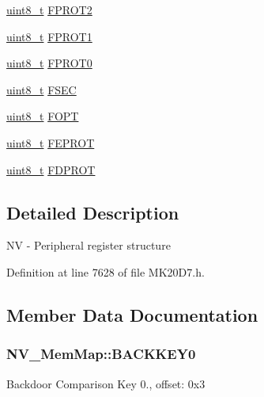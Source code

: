 \begin{DoxyCompactItemize}
\item 
\hyperlink{_p_e___types_8h_aba7bc1797add20fe3efdf37ced1182c5}{uint8\+\_\+t} \hyperlink{struct_n_v___mem_map_aace11e44cee29095fe7c0bf683039f57}{F\+P\+R\+O\+T2}
\item 
\hyperlink{_p_e___types_8h_aba7bc1797add20fe3efdf37ced1182c5}{uint8\+\_\+t} \hyperlink{struct_n_v___mem_map_a87204afdff32b371c03caafdf5a07b69}{F\+P\+R\+O\+T1}
\item 
\hyperlink{_p_e___types_8h_aba7bc1797add20fe3efdf37ced1182c5}{uint8\+\_\+t} \hyperlink{struct_n_v___mem_map_a93d4a444c27eba9b9d8939e52440e8e8}{F\+P\+R\+O\+T0}
\item 
\hyperlink{_p_e___types_8h_aba7bc1797add20fe3efdf37ced1182c5}{uint8\+\_\+t} \hyperlink{struct_n_v___mem_map_acb89fbc884fb10887ef063d1aa892b29}{F\+S\+EC}
\item 
\hyperlink{_p_e___types_8h_aba7bc1797add20fe3efdf37ced1182c5}{uint8\+\_\+t} \hyperlink{struct_n_v___mem_map_a3a3c0ec53723a865f6686bf4696800ba}{F\+O\+PT}
\item 
\hyperlink{_p_e___types_8h_aba7bc1797add20fe3efdf37ced1182c5}{uint8\+\_\+t} \hyperlink{struct_n_v___mem_map_a8de06ecef5c15ac5c29f613d79c9e491}{F\+E\+P\+R\+OT}
\item 
\hyperlink{_p_e___types_8h_aba7bc1797add20fe3efdf37ced1182c5}{uint8\+\_\+t} \hyperlink{struct_n_v___mem_map_a335c056263e0dae36f7a3bb82d08bce8}{F\+D\+P\+R\+OT}
\end{DoxyCompactItemize}


\subsection{Detailed Description}
NV -\/ Peripheral register structure 

Definition at line 7628 of file M\+K20\+D7.\+h.



\subsection{Member Data Documentation}
\subsubsection[{\texorpdfstring{B\+A\+C\+K\+K\+E\+Y0}{BACKKEY0}}]{ N\+V\+\_\+\+Mem\+Map\+::\+B\+A\+C\+K\+K\+E\+Y0}\hypertarget{struct_n_v___mem_map_ad6d790fea8e791ef5cda3685fe306a08}{}\label{struct_n_v___mem_map_ad6d790fea8e791ef5cda3685fe306a08}
Backdoor Comparison Key 0., offset\+: 0x3 


